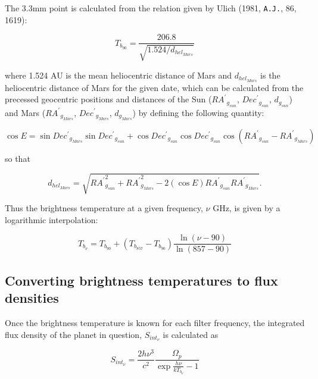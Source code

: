 \documentclass[11pt,twoside]{article}
\newcommand{\xlabel}[1]{}
\renewcommand{\_}{\texttt{\symbol{95}}}
\begin{document}
The 3.3mm point is calculated from the relation given by Ulich (1981, {\tt{A.J.}}, 86, 1619):

\begin{displaymath}
T_{b_{90}} = \frac{206.8}{\sqrt{1.524/d_{hel_{Mars}}}}
\end{displaymath}

where 1.524 AU is the mean heliocentric distance of Mars and $d_{hel_{Mars}}$ is the heliocentric distance of Mars for the given date, which can be calculated from the precessed geocentric positions and distances of the Sun (${RA^\prime}_{g_{sun}}$, ${Dec^\prime}_{g_{sun}}$, $d_{g_{sun}}$) and Mars (${RA^\prime}_{g_{Mars}}$, ${Dec^\prime}_{g_{Mars}}$, $d_{g_{Mars}}$) by defining the following quantity:

\begin{displaymath}
\cos E = \sin {Dec^\prime}_{g_{Mars}} \sin {Dec^\prime}_{g_{sun}} + \cos {Dec^\prime}_{g_{sun}} \cos {Dec^\prime}_{g_{sun}} \cos ({RA^\prime}_{g_{sun}} - {RA^\prime}_{g_{Mars}})
\end{displaymath}

so that

\begin{displaymath}
d_{hel_{Mars}} = \sqrt{{RA^\prime}_{g_{sun}}^2 + {RA^\prime}_{g_{Mars}}^2 - 2 (\cos E){RA^\prime}_{g_{sun}}{RA^\prime}_{g_{Mars}}}.
\end{displaymath}

Thus the brightness temperature at a given frequency, $\nu$ GHz, is given by a logarithmic interpolation:

\begin{displaymath}
T_{b_\nu} = T_{b_{90}} + (T_{b_{857}} - T_{b_{90}})\frac{\ln(\nu - 90)}{\ln(857 -90)}
\end{displaymath}

\subsection{Converting brightness temperatures to flux densities}
\xlabel{fluxdensities}
\label{sec:fluxdensities}

Once the brightness temperature is known for each filter frequency, the integrated flux density of the planet in question, $S_{int_\nu}$ is calculated as

\begin{displaymath}
S_{int_\nu} = \frac{2 h \nu^3}{c^2}\frac{ \Omega_p}{\exp{\frac{h \nu}{k T_{b_\nu}}} - 1}
\end{displaymath}
\end{document}
